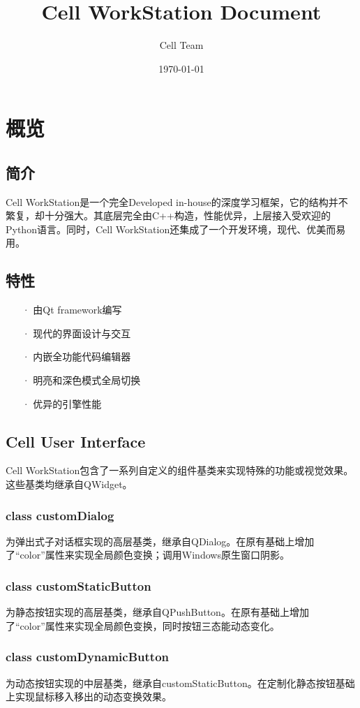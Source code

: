 \documentclass[UTF8]{ctexart}
\title{Cell WorkStation Document}
\author{Cell Team}
\date{\today}
\begin{document}
	\maketitle
	
	\newpage
	\tableofcontents
		
	\newpage
	\section{概览}
		\subsection{简介}
		Cell WorkStation\texttrademark 是一个完全Developed in-house的深度学习框架，它的结构并不繁复，却十分强大。其底层完全由C++构造，性能优异，上层接入受欢迎的Python语言。同时，Cell WorkStation还集成了一个开发环境，现代、优美而易用。
		\subsection{特性}
			\begin{itemize}
				\item[·] 由Qt framework编写
				\item[·] 现代的界面设计与交互
				\item[·] 内嵌全功能代码编辑器
				\item[·] 明亮和深色模式全局切换
				\item[·] 优异的引擎性能
			\end{itemize}
		\subsection{Cell User Interface}
		Cell WorkStation\texttrademark 包含了一系列自定义的组件基类来实现特殊的功能或视觉效果。这些基类均继承自QWidget。
			\subsubsection{class customDialog}
			为弹出式子对话框实现的高层基类，继承自QDialog。在原有基础上增加了“color”属性来实现全局颜色变换；调用Windows原生窗口阴影。
			\subsubsection{class customStaticButton}
			为静态按钮实现的高层基类，继承自QPushButton。在原有基础上增加了“color”属性来实现全局颜色变换，同时按钮三态能动态变化。
			\subsubsection{class customDynamicButton}
			为动态按钮实现的中层基类，继承自customStaticButton。在定制化静态按钮基础上实现鼠标移入移出的动态变换效果。
\end{document}
